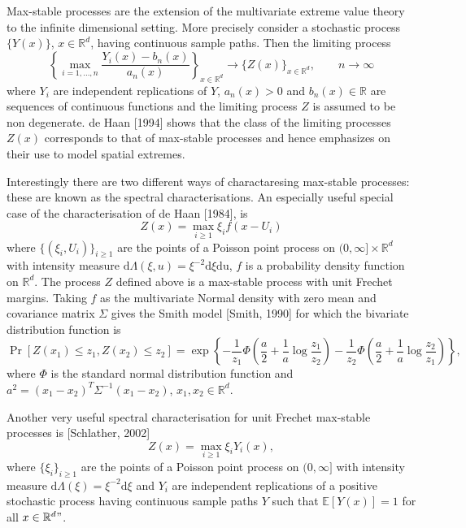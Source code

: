 \documentclass{article}
\begin{document}
Max-stable processes are the extension of the multivariate extreme
value theory to the infinite dimensional setting. More precisely
consider a stochastic process $\{Y(x)\}$, $x \in \mathbb{R}^d$, having
continuous sample paths. Then the limiting process
\begin{equation}
  \label{eq:limitProcess}
  \left\{ \max_{i=1, \ldots, n}
    \frac{Y_i(x) -b_n(x)}{a_n(x)} \right\}_{x \in \mathbb{R}^d}
  \longrightarrow \{Z(x)\}_{x \in \mathbb{R}^d}, \qquad n \to \infty
\end{equation}
where $Y_i$ are independent replications of $Y$, $a_n(x)> 0$ and
$b_n(x) \in \mathbb{R}$ are sequences of continuous functions and the
limiting process $Z$ is assumed to be non degenerate. de Haan [1994]
shows that the class of the limiting processes $Z(x)$ corresponds to
that of max-stable processes and hence emphasizes on their use to
model spatial extremes.

Interestingly there are two different ways of charactaresing
max-stable processes: these are known as the spectral
characterisations. An especially useful special case of the
characterisation of de Haan [1984], is
\begin{equation}
  \label{eq:deHaanCarac}
  Z(x) = \max_{i\geq 1} \xi_i f(x - U_i)
\end{equation}
where $\{(\xi_i, U_i)\}_{i \geq 1}$ are the points of a Poisson point
process on $(0, \infty] \times \mathbb{R}^d$ with intensity measure
$\mbox{d$\Lambda$}(\xi,u) = \xi^{-2} \mbox{d$\xi$} \mbox{du}$, $f$ is
a probability density function on $\mathbb{R}^d$. The process $Z$
defined above is a max-stable process with unit Frechet
margins. Taking $f$ as the multivariate Normal density with zero mean
and covariance matrix $\Sigma$ gives the Smith model [Smith, 1990] for
which the bivariate distribution function is
\begin{equation}
  \label{eq:smithCDF}
  \Pr[Z(x_1) \leq z_1, Z(x_2)
  \leq z_2] = \exp\left\{- \frac{1}{z_1} \Phi\left(\frac{a}{2} +
      \frac{1}{a} \log \frac{z_1}{z_2} \right) - \frac{1}{z_2}
    \Phi\left(\frac{a}{2} + \frac{1}{a} \log \frac{z_2}{z_1} \right)
  \right\},
\end{equation}
where $\Phi$ is the standard normal distribution function and $a^2 =
(x_1 - x_2)^T \Sigma^{-1} (x_1 - x_2)$, $x_1, x_2 \in \mathbb{R}^d$.

Another very useful spectral characterisation for unit Frechet
max-stable processes is [Schlather, 2002]
\begin{equation}
  \label{eq:schlatherCarac}
  Z(x) = \max_{i \geq 1} \xi_i Y_i(x),
\end{equation}
where $\{\xi_i\}_{i \geq 1}$ are the points of a Poisson point process
on $(0, \infty]$ with intensity measure $\mbox{d$\Lambda$}(\xi) =
\xi^{-2} \mbox{d$\xi$}$ and $Y_i$ are independent replications of a
positive stochastic process having continuous sample paths $Y$ such
that $\mathbb{E}[Y(x)] = 1$ for all $x \in \mathbb{R}^d"$.
\end{document}
